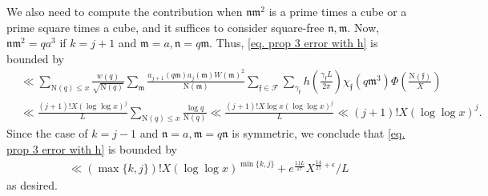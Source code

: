 \documentclass[11pt]{amsart}
\def\n{\mathfrak{n}}
\def\m{\mathfrak{m}}
\newcommand{\norm}{\mathrm{N}}
\numberwithin{equation}{section}
\theoremstyle{remark}
\begin{document}
We also need to compute the contribution when $\n\m^2$ is a prime times a cube or a prime square times a cube, and it suffices to consider square-free $\n, \m$. Now, $\n\m^2=qa^3$ if $k=j+1$ and $\m=a, \n=q\m$.
Thus, \eqref{eq. prop 3 error with h} is bounded by
\begin{align*}
    &\ll
    \sum_{\norm(q)\le x } \frac{w(q)}{\sqrt{\norm(q)}}
    \sum_{\m}
    \frac{a_{j+1}(q\m)a_j(\m)W(\m)^2}{\norm(\m)}
    \sum_{\mathfrak{f}\in \mathcal{F}} \sum_{\gamma_\mathfrak{f}} h\left(\frac{\gamma_\mathfrak{f} L}{2\pi}\right)
    \chi_\mathfrak{f}(q\m^3)
    \Phi\left(\frac{\norm(\mathfrak{f})}{X}\right)
    \\
    &\ll
    \frac{{(j+1)!}
    X\left(\log \log x\right)^{j}}{L}
    \sum_{\norm(q)\le x } \frac{\log q}{{\norm(q)}}
    \ll
    \frac{{(j+1)!}
    X\log x \left(\log \log x\right)^{j}}{L}
    \ll
    {(j+1)!}
    X \left(\log \log x\right)^{j}.
\end{align*}
Since the case of $k=j-1$ and $\n=a, \m=q\n$ is symmetric, we conclude that \eqref{eq. prop 3 error with h} is bounded by 
\begin{align*}
    \ll{(\max\{k, j\})!}
    X \left(\log \log x\right)^{\min\{k,j\}}
    +
    e^{\frac{11L}{27}}X^{\frac{14}{27}+\epsilon}/{L}
\end{align*}
as desired.
\end{document}
